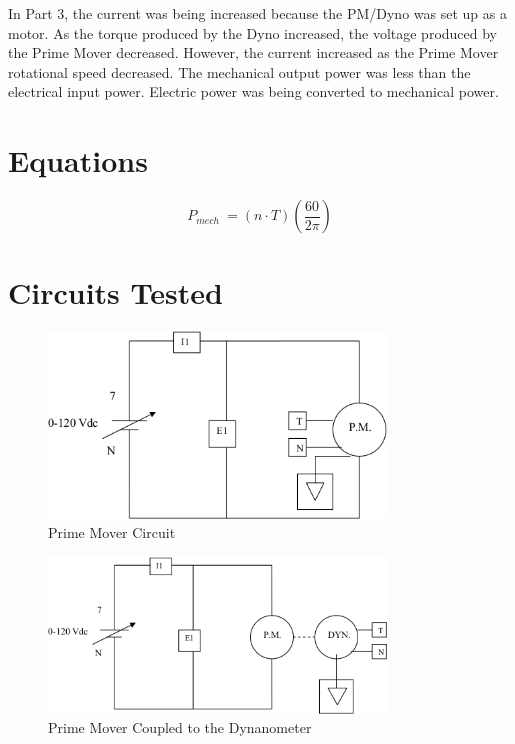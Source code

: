 \documentclass{article}
\begin{document}
In Part 3, the current was being increased because the PM/Dyno was set up as a motor. As the torque produced 
by the Dyno increased, the voltage produced by the Prime Mover decreased. However, the current increased as the 
Prime Mover rotational speed decreased. The mechanical output power was less than the electrical input power. 
Electric power was being converted to mechanical power. 

\section*{Equations}

\[P_{mech}\ =  (n \cdot T)\left(\frac{60}{2\pi}\right) \]

\section*{Circuits Tested}

\begin{figure}[H]
  \centering
  \includegraphics[width=0.8\textwidth]{img/circuit_01}
  \caption{Prime Mover Circuit}
  \label{fig:circuit_01}
\end{figure}

\begin{figure}[H]
  \centering
  \includegraphics[width=0.8\textwidth]{img/circuit_02}
  \caption{Prime Mover Coupled to the Dynanometer}
  \label{fig:circuit_02}
\end{figure}
\end{document}
